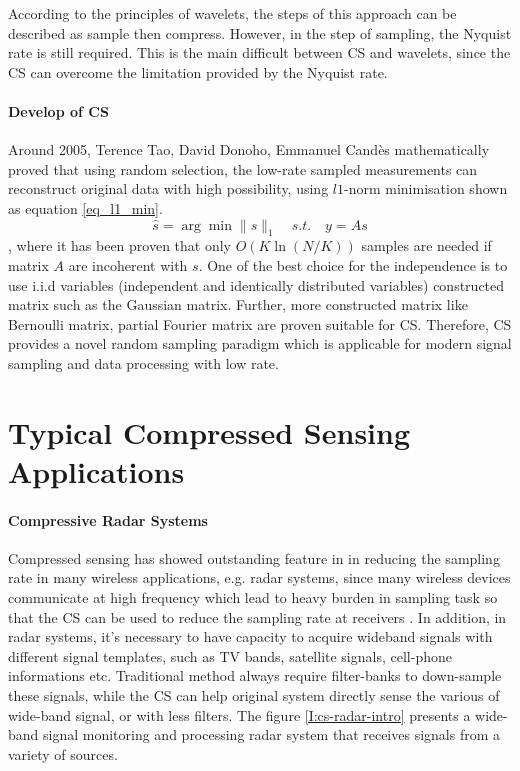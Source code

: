 According to the principles of wavelets, the steps of this approach can be described as sample then compress. However, in the step of sampling, the Nyquist rate is still required. This is the main difficult between CS and wavelets, since the CS can overcome the limitation provided by the Nyquist rate. 

\paragraph{Develop of CS}
Around 2005, Terence Tao, David Donoho, Emmanuel Candès mathematically proved that using random selection, the low-rate sampled measurements can reconstruct original data with high possibility, using $l1$-norm minimisation \cite{candes2006robust,baraniuk2007compressive} shown as equation \ref{eq_l1_min}. 
\begin{equation}
\label{eq_l1_min}
\hat s = \arg\min \| s \|_1 \quad s.t. \quad  y = A s
\end{equation} 
, where it has been proven that only $O(K\ln(N/K))$ samples are needed if matrix $A$ are incoherent with $s$. One of the best choice for the independence is to use i.i.d variables (independent and identically distributed variables) constructed matrix such as the Gaussian matrix. Further, more constructed matrix like Bernoulli matrix, partial Fourier matrix are proven suitable for CS. Therefore, CS provides a novel random sampling paradigm which is applicable for modern signal sampling and data processing with low rate. 

\section{Typical Compressed Sensing Applications}

\paragraph{Compressive Radar Systems}
Compressed sensing has showed outstanding feature in  in reducing the sampling rate in many wireless applications, e.g. radar systems, since many wireless devices communicate at high frequency which lead to heavy burden in sampling task so that the CS can be used to reduce the sampling rate at receivers \cite{bajwa2006compressive}. In addition, in radar systems, it's necessary to have capacity to acquire wideband signals with different signal templates, such as TV bands, satellite signals, cell-phone informations etc. Traditional method always require filter-banks to down-sample these signals, while the CS can help original system directly sense the various of wide-band signal, or with less filters. The figure \ref{I:cs-radar-intro} presents a wide-band signal monitoring and processing radar system that receives signals from a variety of sources.

